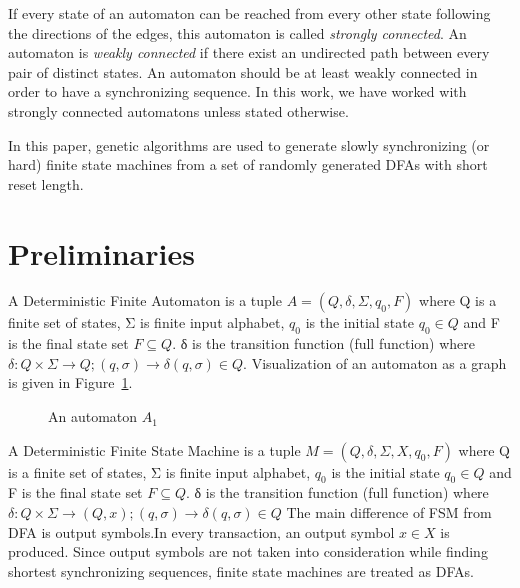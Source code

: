 \documentclass[runningheads]{llncs}
\begin{document}
\par If every state of an automaton can be reached from every other state following the directions of the edges, this automaton is called \textit{strongly connected}. An automaton is \textit{weakly connected} if there exist an undirected path between every pair of distinct states. An automaton should be at least weakly connected in order to have a synchronizing sequence. In this work, we have worked with strongly connected automatons unless stated otherwise. \par In this paper, genetic algorithms are used to generate slowly synchronizing (or hard) finite state machines from a set of randomly generated DFAs with short reset length.

\section{Preliminaries}
\par A Deterministic Finite Automaton is a tuple $A = (Q,\delta, \Sigma, q_{0}, F)$ where Q is a finite set of states, Σ is finite input alphabet,  $q_{0}$ is the initial state $ q_{0} \in Q $ and F is the final state set $F \subseteq Q $. δ
is the transition function (full function) where $\delta: Q \times \Sigma \rightarrow Q ; (q,\sigma) \rightarrow \delta (q,\sigma) \in Q  $. Visualization of an automaton as a graph is given in Figure~\ref{fig:A0}.

\begin{figure}[ht]
	\centering
	\begin{minipage}{.5\textwidth}
		\centering
{}
\caption{An automaton $A_1$}\label{fig:A0}
\end{minipage}
\end{figure}
\par A Deterministic Finite State Machine is a tuple $M = (Q,\delta, \Sigma, X, q_{0}, F)$ where Q is a finite set of states, Σ is finite input alphabet,  $q_{0}$ is the initial state $ q_{0} \in Q $ and F is the final state set $F \subseteq Q $. δ
is the transition function (full function) where $\delta: Q \times \Sigma \rightarrow (Q, x) ; (q,\sigma) \rightarrow \delta (q,\sigma) \in Q  $ The main difference of FSM from DFA is output symbols.In every transaction, an output symbol $x \in X$ is produced. Since output symbols are not taken into consideration while finding shortest synchronizing sequences, finite state machines are treated as DFAs.
\end{document}
